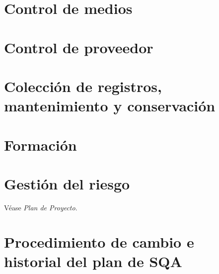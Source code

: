 \documentclass[11pt, a4paper, twoside, titlepage]{article}
\begin{document}
	\section{Control de medios}%
	\section{Control de proveedor}%
	\section{Colección de registros, mantenimiento y conservación}%
	\section{Formación}%
	\section{Gestión del riesgo}
		Véase \textit{Plan de Proyecto}.
		\printglossaries
	\section{Procedimiento de cambio e historial del plan de SQA}%


	\newpage
	
	
\end{document}
